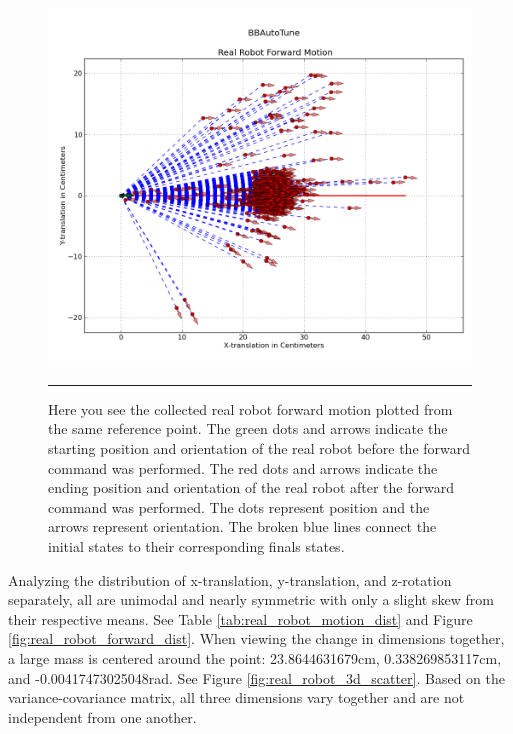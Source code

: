 \begin{figure}[htbp]
\centering
\includegraphics[scale=0.6]{../Figures/Chapter4/real_robot_forward_motion.png}
\rule{35em}{0.5pt}
\caption[Real Robot Forward Motion]{Here you see the collected real robot forward motion plotted from the same reference point. The green dots and arrows indicate the starting position and orientation of the real robot before the forward command was performed. The red dots and arrows indicate the ending position and orientation of the real robot after the forward command was performed. The dots represent position and the arrows represent orientation. The broken blue lines connect the initial states to their corresponding finals states.}
\label{fig:real_robot_forward_motion}
\end{figure}

Analyzing the distribution of x-translation, y-translation, and z-rotation separately, all are unimodal and nearly symmetric with only a slight skew from their respective means. See Table \ref{tab:real_robot_motion_dist} and Figure \ref{fig:real_robot_forward_dist}. When viewing the change in dimensions together, a large mass is centered around the point: 23.8644631679cm, 0.338269853117cm, and -0.00417473025048rad. See Figure \ref{fig:real_robot_3d_scatter}. Based on the variance-covariance matrix, all three dimensions vary together and are not independent from one another. %

